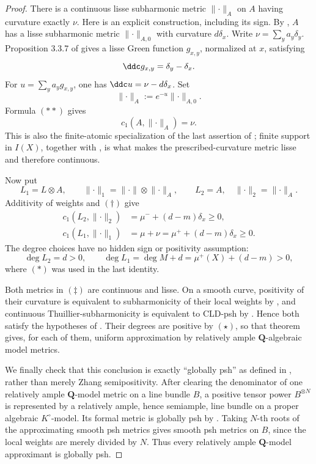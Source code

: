 \begin{proof}
There is a continuous lisse subharmonic metric
\(\lVert\cdot\rVert_A\) on \(A\) having curvature exactly \(\nu\).  Here
is an explicit construction, including its sign.  By
\cite[Rem.~3.4.20]{Thu05}, \(A\) has a lisse subharmonic metric
\(\lVert\cdot\rVert_{A,0}\) with curvature \(d\delta_x\).  Write
\(\nu=\sum_y a_y\delta_y\).  Proposition 3.3.7 of \cite{Thu05} gives a
lisse Green function \(g_{x,y}\), normalized at \(x\), satisfying
\[
                         \ddc g_{x,y}=\delta_y-\delta_x.
\]
For \(u=\sum_y a_y g_{x,y}\), one has
\(\ddc u=\nu-d\delta_x\).  Set
\[
                  \lVert\cdot\rVert_A
                  :=e^{-u}\lVert\cdot\rVert_{A,0}.
\]
Formula \((**)\) gives
\[
                 c_1(A,\lVert\cdot\rVert_A)=\nu.
\]
This is also the finite-atomic specialization of the last assertion of
\cite[Rem.~3.4.20]{Thu05}; finite support in \(I(X)\), together with
\cite[Prop.~3.3.7]{Thu05}, is what makes the prescribed-curvature metric
lisse and therefore continuous.

Now put
\[
 L_1=L\otimes A,
 \qquad
 \lVert\cdot\rVert_1=
 \lVert\cdot\rVert\otimes\lVert\cdot\rVert_A,
 \qquad
 L_2=A,
 \quad \lVert\cdot\rVert_2=\lVert\cdot\rVert_A.
\]
Additivity of weights and \((\dagger)\) give
\[
 \begin{split}
 c_1(L_2,\lVert\cdot\rVert_2)
    &=\mu^-+(d-m)\delta_x\geq0,\\
 c_1(L_1,\lVert\cdot\rVert_1)
    &=\mu+\nu=\mu^++(d-m)\delta_x\geq0.
 \end{split}
\tag{\(\ddagger\)}
\]
The degree choices have no hidden sign or positivity assumption:
\[
 \deg L_2=d>0,
 \qquad
 \deg L_1=\deg M+d
       =\mu^+(X)+(d-m)>0,
\tag{\(\star\)}
\]
where \((*)\) was used in the last identity.

Both metrics in \((\ddagger)\) are continuous and lisse.  On a smooth
curve, positivity of their curvature is equivalent to subharmonicity of
their local weights by \cite[Prop.~3.4.4]{Thu05}, and continuous
Thuillier-subharmonicity is equivalent to CLD-psh by
\cite[Thm.~4.7 and Cor.~4.8]{Wanner19}.  Hence both satisfy the hypotheses
of .  Their degrees are positive by
\((\star)\), so that theorem gives, for each of them, uniform
approximation by relatively ample \(\mathbf Q\)-algebraic model metrics.

We finally check that this conclusion is exactly ``globally psh'' as
defined in \cite[17.8.5]{CLD25}, rather than merely Zhang semipositivity.
After clearing the denominator of one relatively ample
\(\mathbf Q\)-model metric on a line bundle \(B\), a positive tensor power
\(B^{\otimes N}\) is represented by a relatively ample, hence semiample,
line bundle on a proper algebraic \(K^\circ\)-model.  Its formal metric is
globally psh by \cite[Cor.~17.8.7]{CLD25}.  Taking \(N\)-th roots of the
approximating smooth psh metrics gives smooth psh metrics on \(B\), since
the local weights are merely divided by \(N\).  Thus every relatively
ample \(\mathbf Q\)-model approximant is globally psh.


\end{proof}
